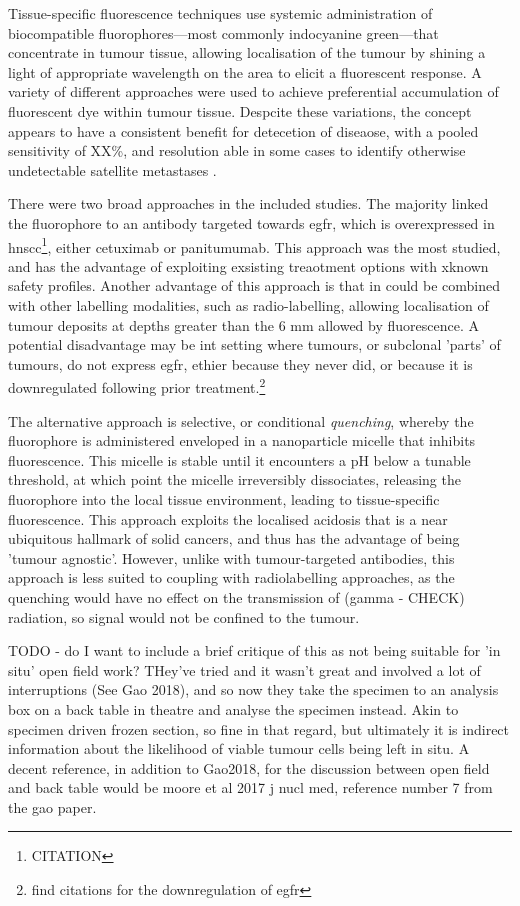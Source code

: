 Tissue-specific fluorescence techniques use systemic administration of biocompatible fluorophores---most commonly indocyanine green---that concentrate in tumour tissue, allowing localisation of the tumour  by shining a light of appropriate wavelength on the area to elicit a fluorescent response.
A variety of different approaches were used to achieve preferential accumulation of fluorescent dye within tumour tissue.
Despcite these variations, the concept appears to have a consistent benefit for detecetion of diseaose, with a pooled sensitivity of XX\%, and resolution able in some cases to identify otherwise undetectable satellite metastases \cite{voskuilf.j.ImageguidedSurgeryTumor2019}.

There were two broad approaches in the included studies. 
The majority linked the fluorophore to an antibody targeted towards \gls{egfr}, which is overexpressed in \gls{hnscc}\footnote{CITATION}, either cetuximab or panitumumab.
This approach was the most studied, and has the advantage of exploiting exsisting treaotment options with xknown safety profiles.
Another advantage of this approach is that in could be combined with other labelling modalities, such as radio-labelling, allowing localisation of tumour deposits at depths greater than the 6 mm allowed by fluorescence.
A potential disadvantage  may be int setting where tumours, or subclonal 'parts' of tumours, do not express \gls{egfr}, ethier because they never did, or because it is downregulated following prior treatment.\footnote{find citations for the downregulation of egfr}

The alternative approach is selective, or conditional \textit{quenching}, whereby the fluorophore is administered enveloped in a nanoparticle micelle that inhibits fluorescence.
This micelle is stable until it encounters a pH below a tunable threshold, at which point the micelle irreversibly dissociates, releasing the fluorophore into the local tissue environment, leading to tissue-specific fluorescence.
This approach exploits the localised acidosis that is a near ubiquitous hallmark of solid cancers, and thus has the advantage of being 'tumour agnostic'.
However, unlike with tumour-targeted antibodies, this approach is less suited to coupling with radiolabelling approaches, as the quenching would have no effect on the transmission of (gamma - CHECK) radiation, so signal would not be confined to the tumour.

TODO - do I want to include a brief critique of this as not being suitable for 'in situ' open field work? 
THey've tried and it wasn't great and involved a lot of interruptions (See Gao 2018), and so now they take the specimen to an analysis box on a back table in theatre and analyse the specimen instead. 
Akin to specimen driven frozen section, so fine in that regard, but ultimately it is indirect information about the likelihood of viable tumour cells being left in situ.
A decent reference, in addition to Gao2018, for the discussion between open field and back table would be moore et al 2017 j nucl med, reference number 7 from the gao paper.

